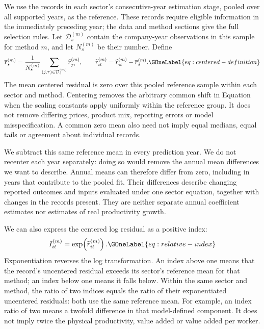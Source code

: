 We use the records in each sector's consecutive-year estimation stage, pooled over all supported years, as the reference. These records require eligible information in the immediately preceding year; the data and method sections give the full selection rules. Let $\mathcal D_s^{(m)}$ contain the company-year observations in this sample for method $m$, and let $N_s^{(m)}$ be their number. Define
\begin{equation}
\overline r_s^{(m)}=\frac{1}{N_s^{(m)}}\sum_{(j,\tau)\in\mathcal D_s^{(m)}}\widehat r_{j\tau}^{(m)},\qquad
\widetilde r_{it}^{(m)}=\widehat r_{it}^{(m)}-\overline r_s^{(m)}.
\GOneLabel{eq:centered-definition}
\end{equation}
The mean centered residual is zero over this pooled reference sample within each sector and method. Centering removes the arbitrary common shift in Equation~ when the scaling constants apply uniformly within the reference group. It does not remove differing prices, product mix, reporting errors or model misspecification. A common zero mean also need not imply equal medians, equal tails or agreement about individual records.

We subtract this same reference mean in every prediction year. We do not recenter each year separately: doing so would remove the annual mean differences we want to describe. Annual means can therefore differ from zero, including in years that contribute to the pooled fit. Their differences describe changing reported outcomes and inputs evaluated under one sector equation, together with changes in the records present. They are neither separate annual coefficient estimates nor estimates of real productivity growth.

We can also express the centered log residual as a positive index:
\begin{equation}
I_{it}^{(m)}=\exp\!\left(\widetilde r_{it}^{(m)}\right).
\GOneLabel{eq:relative-index}
\end{equation}
Exponentiation reverses the log transformation. An index above one means that the record's uncentered residual exceeds its sector's reference mean for that method; an index below one means it falls below. Within the same sector and method, the ratio of two indices equals the ratio of their exponentiated uncentered residuals: both use the same reference mean. For example, an index ratio of two means a twofold difference in that model-defined component. It does not imply twice the physical productivity, value added or value added per worker.

